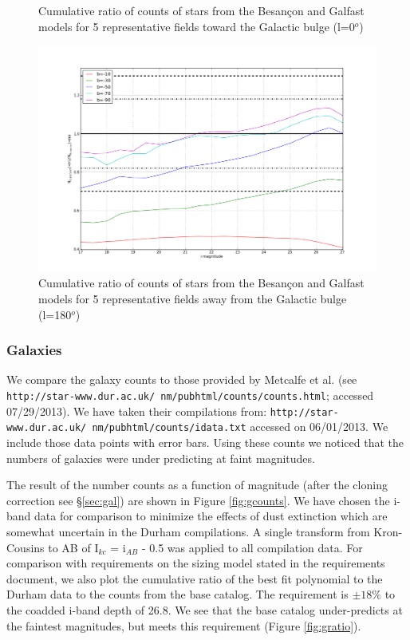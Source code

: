 \documentclass[]{article}
\begin{document}
{\begin{figure}[H]
\caption{Cumulative ratio of counts of stars from the Besan\c{c}on and Galfast models for 5 representative fields toward the Galactic bulge (l=0$^o$) \label{fig:sratio_0}}
\end{figure}
\begin{figure}[H]
\centering
\includegraphics[width=5in]{validation_figures/cumulative_ratio_stars_180_besancon_dust.png}
\caption{Cumulative ratio of counts of stars from the Besan\c{c}on and Galfast models for 5 representative fields away from the Galactic bulge (l=180$^o$) \label{fig:sratio_180}}
\end{figure}

\subsubsection{Galaxies \label{sec:galaxycounts}}
We compare the galaxy counts to those provided by Metcalfe et al. (see {\tt http://star-www.dur.ac.uk/~nm/pubhtml/counts/counts.html}; 
accessed 07/29/2013).  We have taken their compilations from:
{\tt http://star-www.dur.ac.uk/~nm/pubhtml/counts/idata.txt} accessed on 06/01/2013.  
We include those data points with error bars.  
Using these counts
we noticed that the numbers of galaxies were under predicting at faint magnitudes.  

The result of the number counts as a function of magnitude (after the cloning correction see \S \ref{sec:gal}) are shown in Figure \ref{fig:gcounts}.  
We have chosen the i-band data for comparison to 
minimize the effects of dust extinction which are somewhat uncertain in the Durham compilations.  A single transform from Kron-Cousins to AB of I$_{kc}$ = i$_{AB}$ - 0.5 was applied to
all compilation data.  For comparison with requirements on the sizing model stated in the requirements document, we also plot the cumulative ratio of the best fit polynomial
to the Durham data to the counts from the base catalog.  The requirement is $\pm18\%$ to the coadded i-band depth of 26.8.  We see that the base catalog
under-predicts at the faintest magnitudes, but meets this requirement (Figure \ref{fig:gratio}).

}
\end{document}
